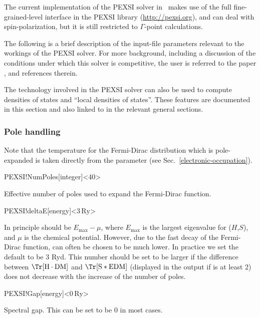 The current implementation of the PEXSI solver in \siesta\ makes
use of the full fine-grained-level interface in the PEXSI library
(\url{http://pexsi.org}), and can deal with spin-polarization, but it
is still restricted to $\Gamma$-point calculations. 

The following is a brief description of the input-file parameters
relevant to the workings of the PEXSI solver. For more background,
including a discussion of the conditions under which this solver is
competitive, the user is referred to the paper \citet{Lin2014}, and
references therein.

The technology involved in the PEXSI solver can also be used
to compute densities of states and ``local densities of
states''. These features are documented in this section and also
linked to in the relevant general sections.

\subsubsection{Pole handling}

Note that the temperature for the Fermi-Dirac distribution which is
pole-expanded is taken directly from the 
parameter (see Sec.~\ref{electronic-occupation}).

\begin{fdfentry}{PEXSI!NumPoles}[integer]<40>

  Effective number of poles used to expand the Fermi-Dirac function.
  
\end{fdfentry}

\begin{fdfentry}{PEXSI!deltaE}[energy]<$3\,\mathrm{Ry}$>
  
  In principle  should be $E_{\max}-\mu$, where
  $E_{\max}$ is the largest eigenvalue for ($H$,$S$), and $\mu$ is the
  chemical potential. However, due to the fast decay of the
  Fermi-Dirac function,  can often be chosen to be
  much lower.  In practice we set the default to be 3 Ryd.  This
  number should be set to be larger if the difference between
  $\Tr[\mathrm H\cdot\mathrm{DM}]$ and $\Tr[\mathrm S*\mathrm{EDM}]$
  (displayed in the output if  is at least 2)
  does not decrease with the increase of the number of poles.

\end{fdfentry}


\begin{fdfentry}{PEXSI!Gap}[energy]<$0\,\mathrm{Ry}$>

  Spectral gap. This can be set to be 0 in most cases.

\end{fdfentry}



